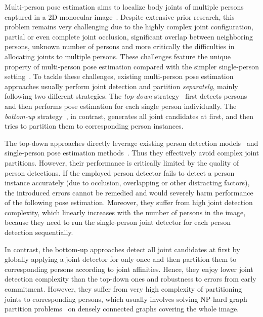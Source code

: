 \documentclass[10pt,twocolumn,letterpaper]{article}
\begin{document}
Multi-person pose estimation aims to localize body joints of multiple persons captured in a 2D monocular image~\cite{eichner2010we,hpe:deepcut_cvpr16}. Despite extensive prior research, this problem  remains very challenging due to the highly complex joint configuration,  partial or even complete joint occlusion, significant overlap between neighboring persons, unknown number of persons and more critically the difficulties in allocating   joints to multiple persons.
These challenges feature the unique property of multi-person pose estimation compared with the simpler single-person setting~\cite{hpe:hourglass_arxiv15,hpe:conv_pose_machine_arxiv16}. To tackle these challenges, existing multi-person pose estimation approaches usually perform joint detection and  partition \emph{separately}, mainly following two different strategies. The \emph{top-down}
strategy~\cite{eichner2010we,fang16rmpe,iqbal2016multi,papandreou2017towards,pishchulin2012articulated} first detects persons and then performs pose estimation for each single person individually.
The \emph{bottom-up} strategy~\cite{cao2017realtime,insafutdinov2016articulated,hpe:deepercut_eccv16,ladicky2013human,levinkov2017joint,hpe:deepcut_cvpr16}, in contrast, generates all joint candidates
at first, and then tries to partition them to corresponding person instances.

The top-down approaches  directly leverage existing   person detection models~\cite{liu2016ssd,ren2015faster} and single-person pose estimation  methods~\cite{hpe:hourglass_arxiv15,hpe:conv_pose_machine_arxiv16}. Thus they effectively avoid complex  joint partitions.
However, their performance is critically limited by the quality of person detections. If the employed person detector fails to detect a person instance accurately (due to occlusion, overlapping or other distracting factors), the introduced errors cannot be remedied  and would severely harm performance of the following pose estimation. Moreover, they suffer from high  joint detection complexity, which linearly increases with the number of persons in the image, because they need  to run the single-person joint detector for each person detection sequentially.

In contrast, the bottom-up approaches  detect all joint candidates at first by globally applying a joint  detector for only once and then partition them to corresponding persons according to joint affinities. Hence, they enjoy lower joint detection complexity than the top-down ones and  robustness to errors from early commitment. However, they suffer from very high complexity of partitioning joints to corresponding persons, which usually involves solving NP-hard graph partition problems~\cite{hpe:deepercut_eccv16,hpe:deepcut_cvpr16} on densely connected graphs covering the whole image.
\end{document}

